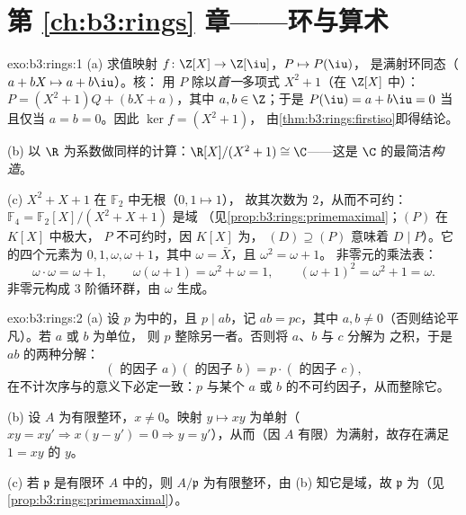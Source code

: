 \section*{第 \ref{ch:b3:rings} 章——环与算术}

\begin{solution}{exo:b3:rings:1}
(a) 求值映射 $f \colon \Z[X] \to \Z[\iu]$，$P \mapsto P(\iu)$，
是满射环同态（$a + bX \mapsto a + b\iu$）。核：
用 $P$ 除以\emph{首一}多项式 $X^2 + 1$（在 $\Z[X]$ 中）：$P = (X^2 +
1)Q + (bX + a)$，其中 $a, b \in \Z$；于是 $P(\iu) = a + b\iu = 0$
当且仅当 $a = b = 0$。因此 $\ker f = (X^2+1)$，
由\cref{thm:b3:rings:firstiso}即得结论。

(b) 以 $\R$ 为系数做同样的计算：$\R[X]/(X^2+1)
\cong \C$——这是 $\C$ 的最简洁\emph{构造}。

(c) $X^2 + X + 1$ 在 $\mathbb F_2$ 中无根（$0, 1 \mapsto 1$），
故其次数为 $2$，从而不可约： $\mathbb
F_4 = \mathbb F_2[X]/(X^2+X+1)$ 是域
（见\cref{prop:b3:rings:primemaximal}；$(P)$ 在 $K[X]$ 中极大，
$P$ 不可约时，因 $K[X]$ 为， $(D) \supseteq
(P)$ 意味着 $D \mid P$）。它的四个元素为 $0, 1, \omega,
\omega + 1$，其中 $\omega = \bar X$，且 $\omega^2 = \omega + 1$。
非零元的乘法表：
\[
\omega \cdot \omega = \omega + 1, \qquad
\omega(\omega + 1) = \omega^2 + \omega = 1, \qquad
(\omega+1)^2 = \omega^2 + 1 = \omega .
\]
非零元构成 $3$ 阶循环群，由
$\omega$ 生成。
\end{solution}

\begin{solution}{exo:b3:rings:2}
(a) 设 $p$ 为中的，且 $p \mid ab$，记 $ab =
pc$，其中 $a, b \neq 0$（否则结论平凡）。若 $a$ 或 $b$ 为单位，
则 $p$ 整除另一者。否则将 $a$、$b$ 与 $c$ 分解为
之积，于是 $ab$ 的两种分解：
\[
(\text{ 的因子 } a)(\text{ 的因子 } b) = p \cdot
(\text{ 的因子 } c),
\]
在不计次序与的意义下必定一致：$p$ 与某个
$a$ 或 $b$ 的不可约因子，从而整除它。

(b) 设 $A$ 为有限整环，$x \neq 0$。映射 $y \mapsto
xy$ 为单射（$xy = xy' \Rightarrow x(y - y') = 0 \Rightarrow
y = y'$），从而（因 $A$ 有限）为满射，故存在满足 $1 = xy$ 的 $y$。

(c) 若 $\mathfrak p$ 是有限环 $A$ 中的，则
$A/\mathfrak p$ 为有限整环，由 (b) 知它是域，故
$\mathfrak p$ 为（见\cref{prop:b3:rings:primemaximal}）。
\end{solution}

